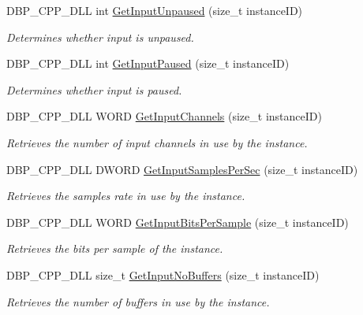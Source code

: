 \begin{DoxyCompactItemize}
DBP\_\-CPP\_\-DLL int \hyperlink{namespacemn_sound_a6d3720f66a652c770c47e95f418b2e5c}{GetInputUnpaused} (size\_\-t instanceID)
\begin{DoxyCompactList}\small\item\em Determines whether input is unpaused. \item\end{DoxyCompactList}\item 
DBP\_\-CPP\_\-DLL int \hyperlink{namespacemn_sound_a2a68fc13b004d220247bb1f60d31b538}{GetInputPaused} (size\_\-t instanceID)
\begin{DoxyCompactList}\small\item\em Determines whether input is paused. \item\end{DoxyCompactList}\item 
DBP\_\-CPP\_\-DLL WORD \hyperlink{namespacemn_sound_a455f5c24b242a1e125b435a9ac94b600}{GetInputChannels} (size\_\-t instanceID)
\begin{DoxyCompactList}\small\item\em Retrieves the number of input channels in use by the instance. \item\end{DoxyCompactList}\item 
DBP\_\-CPP\_\-DLL DWORD \hyperlink{namespacemn_sound_a22e8862bb6f27d63cdf0d6672cb98698}{GetInputSamplesPerSec} (size\_\-t instanceID)
\begin{DoxyCompactList}\small\item\em Retrieves the samples rate in use by the instance. \item\end{DoxyCompactList}\item 
DBP\_\-CPP\_\-DLL WORD \hyperlink{namespacemn_sound_a9c048e63cba1dbc161254174c7d01f83}{GetInputBitsPerSample} (size\_\-t instanceID)
\begin{DoxyCompactList}\small\item\em Retrieves the bits per sample of the instance. \item\end{DoxyCompactList}\item 
DBP\_\-CPP\_\-DLL size\_\-t \hyperlink{namespacemn_sound_a1cc7ad0b3b3e4922e043d44d8080b639}{GetInputNoBuffers} (size\_\-t instanceID)
\begin{DoxyCompactList}\small\item\em Retrieves the number of buffers in use by the instance. \item\end{DoxyCompactList}\item 

\end{DoxyCompactItemize}
